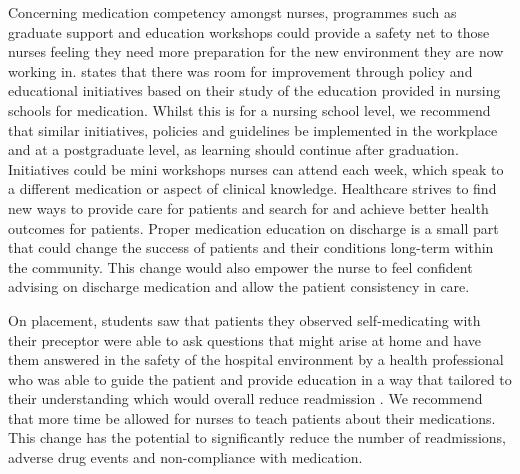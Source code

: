 \documentclass[british,12pt,a4paper]{article}
\begin{document}
Concerning medication competency amongst nurses, programmes such as graduate support and education workshops could provide a safety net to those nurses feeling they need more preparation for the new environment they are now working in. \textcite{Sulosaari2014} states that there was room for improvement through policy and educational initiatives based on their study of the education provided in nursing schools for medication. Whilst this is for a nursing school level, we recommend that similar initiatives, policies and guidelines be implemented in the workplace and at a postgraduate level, as learning should continue after graduation. Initiatives could be mini workshops nurses can attend each week, which speak to a different medication or aspect of clinical knowledge. Healthcare strives to find new ways to provide care for patients and search for and achieve better health outcomes for patients. Proper medication education on discharge is a small part that could change the success of patients and their conditions long-term within the community. This change would also empower the nurse to feel confident advising on discharge medication and allow the patient consistency in care.

On placement, students saw that patients they observed self-medicating with their preceptor were able to ask questions that might arise at home and have them answered in the safety of the hospital environment by a health professional who was able to guide the patient and provide education in a way that tailored to their understanding which would overall reduce readmission \parencite{Sanjai2019}. We recommend that more time be allowed for nurses to teach patients about their medications. This change has the potential to significantly reduce the number of readmissions, adverse drug events and non-compliance with medication.
\end{document}
